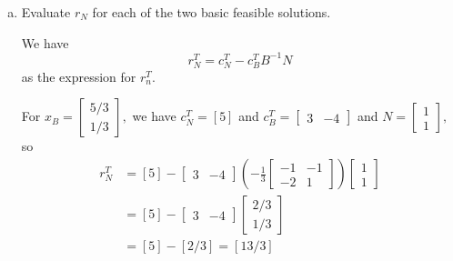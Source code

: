\documentclass{article}
\begin{document}
\begin{enumerate}
\begin{enumerate}[a)]
\begin{soln}
				\end{soln}

				\newpage
			\item Evaluate $r_N$ for each of the two basic feasible solutions.
				\begin{soln}
					We have \[r_N^T=c_N^T - c_B^T B^{-1}N\] as the expression for $r_n^T.$

					For $x_B=\begin{bmatrix}
						5/3 \\ 1/3
					\end{bmatrix},$ we have $c_N^T = [5]$ and $c_B^{T}=\begin{bmatrix}
						3 & -4
					\end{bmatrix}$ and $N=\begin{bmatrix}
						1 \\ 1
					\end{bmatrix},$ so 
					\begin{align*}
						r_N^T &= [5] - \begin{bmatrix}
							3 & -4
						\end{bmatrix}\left( -\frac{1}{3}\begin{bmatrix}
							-1 & -1  \\
							-2 & 1
						\end{bmatrix}\right) \begin{bmatrix}
							1 \\ 1
						\end{bmatrix} \\ 
						&= [5] - \begin{bmatrix}
							3 & -4
						\end{bmatrix}\begin{bmatrix}
							2/3 \\ 1/3
						\end{bmatrix} \\
						&= [5]-[2/3]=[13/3]
					\end{align*}


\end{soln}
\end{enumerate}
\end{enumerate}
\end{document}
